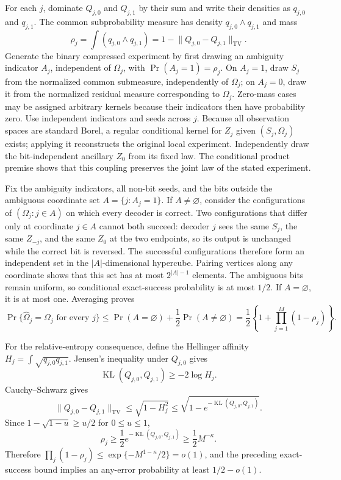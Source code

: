 For each \(j\), dominate \(Q_{j,0}\) and \(Q_{j,1}\) by their sum and write their densities as \(q_{j,0}\) and \(q_{j,1}\).  The common subprobability measure has density \(q_{j,0}\wedge q_{j,1}\) and mass
\[
 \rho_j=\int(q_{j,0}\wedge q_{j,1})
 =1-\lVert Q_{j,0}-Q_{j,1}\rVert_{\mathrm{TV}}.
\]
Generate the binary compressed experiment by first drawing an ambiguity indicator \(A_j\), independent of \(\Omega_j\), with \(\Pr(A_j=1)=\rho_j\).  On \(A_j=1\), draw \(S_j\) from the normalized common submeasure, independently of \(\Omega_j\); on \(A_j=0\), draw it from the normalized residual measure corresponding to \(\Omega_j\).  Zero-mass cases may be assigned arbitrary kernels because their indicators then have probability zero.  Use independent indicators and seeds across \(j\).  Because all observation spaces are standard Borel, a regular conditional kernel for \(Z_j\) given \((S_j,\Omega_j)\) exists; applying it reconstructs the original local experiment.  Independently draw the bit-independent ancillary \(Z_0\) from its fixed law.  The conditional product premise shows that this coupling preserves the joint law of the stated experiment.

Fix the ambiguity indicators, all non-bit seeds, and the bits outside the ambiguous coordinate set \(A=\{j:A_j=1\}\).  If \(A\neq\varnothing\), consider the configurations of \((\Omega_j:j\in A)\) on which every decoder is correct.  Two configurations that differ only at coordinate \(j\in A\) cannot both succeed: decoder \(j\) sees the same \(S_j\), the same \(Z_{-j}\), and the same \(Z_0\) at the two endpoints, so its output is unchanged while the correct bit is reversed.  The successful configurations therefore form an independent set in the \(|A|\)-dimensional hypercube.  Pairing vertices along any coordinate shows that this set has at most \(2^{|A|-1}\) elements.  The ambiguous bits remain uniform, so conditional exact-success probability is at most \(1/2\).  If \(A=\varnothing\), it is at most one.  Averaging proves
\[
 \Pr\{\widehat\Omega_j=\Omega_j\text{ for every }j\}
 \leq\Pr(A=\varnothing)+\frac12\Pr(A\neq\varnothing)
 =\frac12\left\{1+\prod_{j=1}^M(1-\rho_j)\right\}.
\]

For the relative-entropy consequence, define the Hellinger affinity \(H_j=\int\sqrt{q_{j,0}q_{j,1}}\).  Jensen's inequality under \(Q_{j,0}\) gives
\[
 \operatorname{KL}(Q_{j,0},Q_{j,1})\geq-2\log H_j.
\]
Cauchy--Schwarz gives
\[
 \lVert Q_{j,0}-Q_{j,1}\rVert_{\mathrm{TV}}
 \leq\sqrt{1-H_j^2}
 \leq\sqrt{1-e^{-\operatorname{KL}(Q_{j,0},Q_{j,1})}}.
\]
Since \(1-\sqrt{1-u}\geq u/2\) for \(0\leq u\leq1\),
\[
 \rho_j\geq\frac12e^{-\operatorname{KL}(Q_{j,0},Q_{j,1})}
 \geq\frac12M^{-\kappa}.
\]
Therefore \(\prod_j(1-\rho_j)\leq\exp\{-M^{1-\kappa}/2\}=o(1)\), and the preceding exact-success bound implies an any-error probability at least \(1/2-o(1)\).